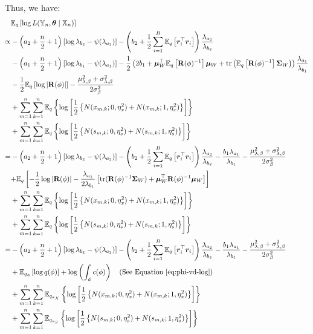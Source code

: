 \documentclass[numsec,webpdf,modern,medium,namedate]{oup-authoring-template}
\theoremstyle{thmstyleone}%
\theoremstyle{thmstyletwo}%
\theoremstyle{thmstylethree}%
\begin{document}
Thus, we have:
{\footnotesize
\begin{equation}\label{eq:elbo-joint-lkhd}
    \begin{split}
        & \mathbb{E}_q \left[\log L(\mathbb{Y}_n,\boldsymbol{\theta}\mid\mathbb{X}_n)\right] \\
        \propto & -\left(a_2 + \frac{n}{2} + 1\right)[\log \lambda_{b_2} - \psi(\lambda_{a_2})] -\left(b_2 + \frac{1}{2}\sum_{i=1}^B \mathbb{E}_q\left[\boldsymbol{r}_i^\top \boldsymbol{r}_i\right]\right)\frac{\lambda_{a_2}}{\lambda_{b_2}} \\
        & -\left(a_1 + \frac{n}{2} + 1\right)[\log \lambda_{b_1} - \psi(\lambda_{a_1})] - \frac{1}{2}\left(2b_1 + \boldsymbol{\mu}_W^\top \mathbb{E}_q\left[\mathbf{R}(\phi)^{-1}\right] \boldsymbol{\mu}_W + \mathrm{tr}\left(\mathbb{E}_q\left[\mathbf{R}(\phi)^{-1}\right]\boldsymbol{\Sigma}_W\right)\right)\frac{\lambda_{a_1}}{\lambda_{b_1}} \\
        & -\frac{1}{2} \mathbb{E}_q\left[\log |\mathbf{R}(\phi)|\right] - \frac{\mu^2_{\lambda,\beta} +\sigma^2_{\lambda,\beta}}{2\sigma^2_\beta}\\
        &+\sum_{m=1}^{n}\sum_{k=1}^{n}\mathbb{E}_q \left\{\log \left[\dfrac{1}{2}\left\{N(x_{m,k};0,\eta^2_x) + N(x_{m,k};1,\eta^2_x)\right\}\right]\right\}\\
&+\sum_{m=1}^{n}\sum_{k=1}^{n} \mathbb{E}_q\left\{\log \left[\dfrac{1}{2}\left\{N(s_{m,k};0,\eta^2_s) + N(s_{m,k};1,\eta^2_s)\right\}\right]\right\}\\
= & -\left(a_2 + \frac{n}{2} + 1\right)[\log \lambda_{b_2} - \psi(\lambda_{a_2})] -\left(b_2 + \frac{1}{2}\sum_{i=1}^B \mathbb{E}_q\left[\boldsymbol{r}_i^\top \boldsymbol{r}_i\right]\right)\frac{\lambda_{a_2}}{\lambda_{b_2}} -\frac{b_1\lambda_{a_1}}{\lambda_{b_1}} - \frac{\mu^2_{\lambda,\beta} +\sigma^2_{\lambda,\beta}}{2\sigma^2_\beta}\\
& {+} \mathbb{E}_q\left[-\frac{1}{2} \log |\mathbf{R}(\phi)| - \frac{\lambda_{a_1}}{2\lambda_{b_1}} \left[\mathrm{tr}(\mathbf{R}(\phi)^{-1} \boldsymbol{\Sigma}_W) + \boldsymbol{\mu}_W^\top \mathbf{R}(\phi)^{-1} \boldsymbol{\mu}_W\right]\right] \\
&+\sum_{m=1}^{n}\sum_{k=1}^{n}\mathbb{E}_q \left\{\log \left[\dfrac{1}{2}\left\{N(x_{m,k};0,\eta^2_x) + N(x_{m,k};1,\eta^2_x)\right\}\right]\right\}\\
&+\sum_{m=1}^{n}\sum_{k=1}^{n} \mathbb{E}_q\left\{\log \left[\dfrac{1}{2}\left\{N(s_{m,k};0,\eta^2_s) + N(s_{m,k};1,\eta^2_s)\right\}\right]\right\}\\
= & -\left(a_2 + \frac{n}{2} + 1\right)[\log \lambda_{b_2} - \psi(\lambda_{a_2})] -\left(b_2 + \frac{1}{2}\sum_{i=1}^B \mathbb{E}_q\left[\boldsymbol{r}_i^\top \boldsymbol{r}_i\right]\right)\frac{\lambda_{a_2}}{\lambda_{b_2}} -\frac{b_1\lambda_{a_1}}{\lambda_{b_1}} - \frac{\mu^2_{\lambda,\beta} +\sigma^2_{\lambda,\beta}}{2\sigma^2_\beta}\\
& + \mathbb{E}_{q_\phi}\left[\log q(\phi)\right] + \log \left(\int_\phi c(\phi)\right)\quad \text{(See Equation \ref{eq:phi-vd-log})} \\
&+\sum_{m=1}^{n}\sum_{k=1}^{n}\mathbb{E}_{q_{\kappa_X}} \left\{\log \left[\dfrac{1}{2}\left\{N(x_{m,k};0,\eta^2_x) + N(x_{m,k};1,\eta^2_x)\right\}\right]\right\}\\
&+\sum_{m=1}^{n}\sum_{k=1}^{n} \mathbb{E}_{q_{\kappa_S}}\left\{\log \left[\dfrac{1}{2}\left\{N(s_{m,k};0,\eta^2_s) + N(s_{m,k};1,\eta^2_s)\right\}\right]\right\}\\
    \end{split}
\end{equation}}
\end{document}
